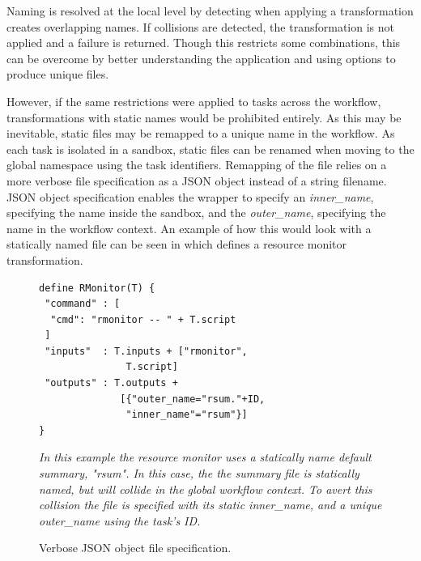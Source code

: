 \documentclass[conference]{IEEEtran}
\begin{document}
Naming is resolved at the local level by detecting
when applying a transformation 
creates overlapping names.
If collisions are detected, the 
transformation is not applied and
a failure is returned.
Though this restricts some combinations, 
this can be overcome by 
better understanding the application
and using options to 
produce unique files.


However, if the same restrictions were
applied to tasks across the workflow,
transformations with static names would
be prohibited entirely.
As this may be inevitable,
static files may be remapped
to a unique name in the workflow.
As each task is isolated in a sandbox, 
static files can be renamed when moving to the 
global namespace using the task identifiers. 
Remapping of the file relies on
a more verbose file specification as
a JSON object instead of a string filename.
JSON object specification enables the wrapper
to specify an \emph{inner\_name}, 
specifying the name inside the sandbox,
and the \emph{outer\_name},
specifying the name in the workflow context. 
An example of how this would look with
a statically named file can be seen in 
 which defines a resource
monitor transformation.

\begin{figure}[h]
\begin{framed}
\begin{verbatim}
define RMonitor(T) {
 "command" : [
  "cmd": "rmonitor -- " + T.script
 ]
 "inputs"  : T.inputs + ["rmonitor",
               T.script]
 "outputs" : T.outputs +
              [{"outer_name="rsum."+ID, 
               "inner_name"="rsum"}]
}
\end{verbatim}
\end{framed}
\caption{Verbose JSON object file specification.} 
\small
\emph{In this example the resource monitor uses
a statically name default summary, "rsum".
In this case, the the summary 
file is statically named, but will collide in
the global workflow context. To avert this
collision the file is specified with its 
static inner\_name, and a unique outer\_name
using the task's ID.}
\label{json-file}
\end{figure}
\end{document}
